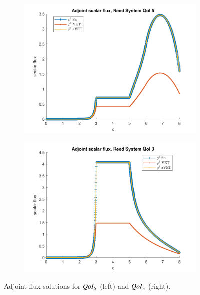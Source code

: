 \documentclass{anstrans}
\newcommand{\qoi}{{\it QoI}\xspace}
\begin{document}
\begin{figure}
\centering
\begin{subfigure}{.25\textwidth}
  \centering
  \includegraphics[width=.98\linewidth]{../Thesis/figures2/774phia.png}
\end{subfigure}%
\begin{subfigure}{.25\textwidth}
  \centering
  \includegraphics[width=.98\linewidth]{../Thesis/figures2/772phia.png}
\end{subfigure}
\caption{Adjoint flux solutions for $\qoi_5$ (left) and $\qoi_3$ (right).}
\label{fig:adj}
\end{figure}
\end{document}
